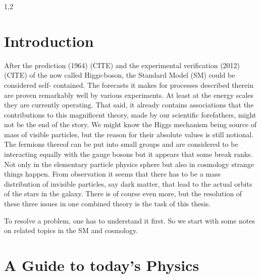 \documentclass[11pt,a4paper,twoside]{article}
\numberwithin{equation}{section}
\begin{document}
\begin{spacing}{1,2}

\thispagestyle{empty}
 \cleardoublepage

\setcounter{page}{1}
\pagestyle{fancy}

\section{Introduction}
After the prediction (1964) (CITE) and the experimental verification (2012) (CITE) of the
now called Higgs-boson, the Standard Model (SM) could be considered self-
contained. The forecasts it makes for processes described therein are proven
remarkably well by various experiments. At least at the energy scales they
are currently operating. That said, it already contains associations that the
contributions to this magnificent theory, made by our scientific forefathers, might not be
the end of the story. We might know the Higgs mechanism being source of mass of visible particles,
but the reason for their absolute values is still notional. The fermions thereof can be put into
small groups and are considered to be interacting equally with the gauge bosons but it appears
that some break ranks. Not only in the elementary particle physics sphere but also in cosmology
strange things happen. From observation it seems that there has to be a mass distribution of
invisible particles, say dark matter, that lead to the actual orbits of the stars in the galaxy.
There is of course even more, but the resolution of these three issues in one combined theory is
the task of this thesis.

\noindent To resolve a problem, one has to understand it first. So we start with some notes on 
related topics in the SM and cosmology.




\section{A Guide to today's Physics}


\end{spacing}
\end{document}

